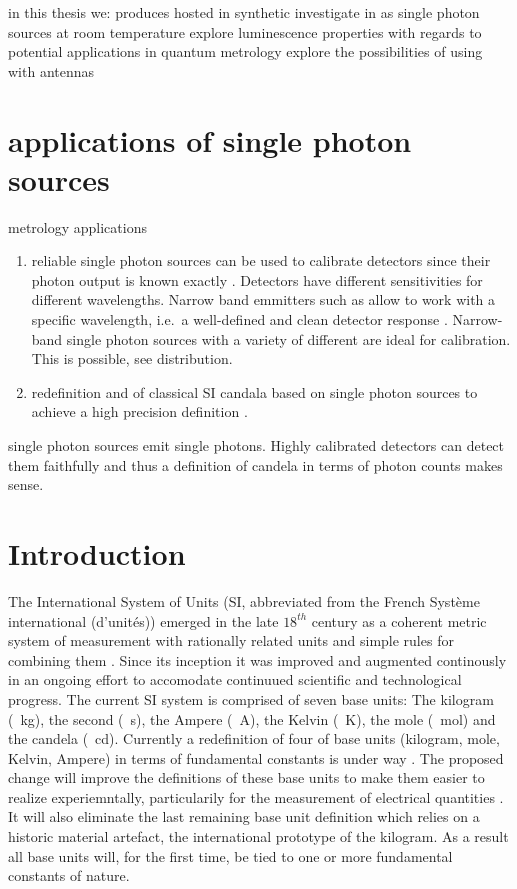 			in this thesis we:
				produces \sivs hosted in synthetic \nds
				investigate \sivs in \nds as single photon sources at room temperature
				explore luminescence properties with regards to potential applications in quantum metrology
				explore the possibilities of using \sivs with antennas


		\section{applications of single photon sources}

			metrology applications

			\begin{enumerate}
					\item reliable single photon sources can be used to calibrate detectors since their photon output is known exactly \cite{Vaigu2017}. Detectors have different sensitivities for different wavelengths. Narrow band emmitters such as \sivs allow to work with a specific wavelength, i.e.\ a well-defined and clean detector response \cite{Rodiek2017}. Narrow-band single photon sources with a variety of different \wl are ideal for calibration. This is possible, see distribution.
					\item redefinition and of classical SI candala based on single photon sources to achieve a high precision definition \cite{SIQUTE}.
			\end{enumerate}

			single photon sources emit single photons. Highly calibrated detectors can detect them faithfully and thus a definition of candela in terms of photon counts makes sense.


		\section{Introduction}

			The International System of Units (SI, abbreviated from the French Système international (d'unités)) emerged in the late $18^{th}$ century as a coherent metric system of measurement with rationally related units and simple rules for combining them \cite{zwinckels::1}. Since its inception it was improved and augmented continously in an ongoing effort to accomodate continuued scientific and technological progress. The current SI system is comprised of seven base units: The kilogram (\SI{}{\kg}), the second (\SI{}{\s}), the Ampere (\SI{}{\ampere}), the Kelvin (\SI{}{\kelvin}), the mole (\SI{}{\mole}) and the candela (\SI{}{\candela}). Currently a redefinition of four of base units (kilogram, mole, Kelvin, Ampere) in terms of fundamental constants is under way \cite{zwinckels::3, Milton, Martin (14 November 2016). Highlights in the work of the BIPM in 2016}. The proposed change will improve the definitions of these base units to make them easier to realize experiemntally, particularily for the measurement of electrical quantities \cite{zwinckels::paper}. It will also eliminate the last remaining base unit definition which relies on a historic material artefact, the international prototype of the kilogram. As a result all base units will, for the first time, be tied to one or more fundamental constants of nature.

